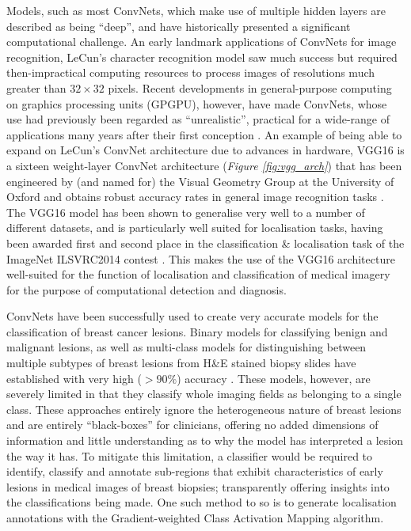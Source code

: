 Models, such as most ConvNets, which make use of multiple hidden layers are described as being ``deep'', and have historically presented a significant computational challenge. An early landmark applications of ConvNets for image recognition, LeCun's character recognition model saw much success but required then-impractical computing resources to process images of resolutions much greater than $32\times32$ pixels. Recent developments in general-purpose computing on graphics processing units (GPGPU), however, have made ConvNets, whose use had previously been regarded as ``unrealistic'', practical for a wide-range of applications many years after their first conception \citep{simard2005, crick1989}. An example of being able to expand on LeCun's ConvNet architecture due to advances in hardware, VGG16 is a sixteen weight-layer ConvNet architecture (\textit{Figure \ref{fig:vgg_arch}}) that has been engineered by (and named for) the Visual Geometry Group at the University of Oxford and obtains robust accuracy rates in general image recognition tasks \citep{simonyan2014}. The VGG16 model has been shown to generalise very well to a number of different datasets, and is particularly well suited for localisation tasks, having been awarded first and second place in the classification \& localisation task of the ImageNet ILSVRC2014 contest \citep{imagenet}. This makes the use of the VGG16 architecture well-suited for the function of localisation and classification of medical imagery for the purpose of computational detection and diagnosis.

ConvNets have been successfully used to create very accurate models for the classification of breast cancer lesions. Binary models for classifying benign and malignant lesions, as well as multi-class models for distinguishing between multiple subtypes of breast lesions from H\&E stained biopsy slides have established with very high ($>90\%$) accuracy \citep{wei2017, han2017}. These models, however, are severely limited in that they classify whole imaging fields as belonging to a single class. These approaches entirely ignore the heterogeneous nature of breast lesions and are entirely ``black-boxes'' for clinicians, offering no added dimensions of information and little understanding as to why the model has interpreted a lesion the way it has. To mitigate this limitation, a classifier would be required to identify, classify and annotate sub-regions that exhibit characteristics of early lesions in medical images of breast biopsies; transparently offering insights into the classifications being made. One such method to so is to generate localisation annotations with the Gradient-weighted Class Activation Mapping algorithm. \par

